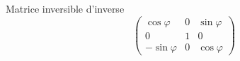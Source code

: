 Matrice inversible d'inverse
\begin{displaymath}
  \begin{pmatrix}
  \cos \varphi & 0 & \sin \varphi \\
   0           & 1 & 0     \\
  -\sin \varphi & 0 & \cos \varphi
\end{pmatrix}
\end{displaymath}
